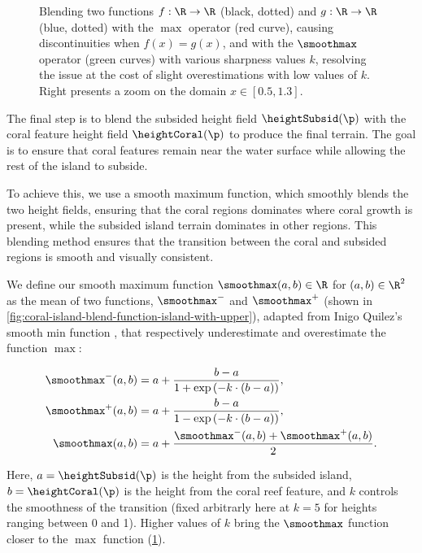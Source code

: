 \begin{figure}
    \caption[Effect of $k$ on the $\smoothmax$ operator]{Blending two functions $f: \R \to \R$ (black, dotted) and $g: \R \to \R$ (blue, dotted) with the $\max$ operator (red curve), causing discontinuities when $f(x)=g(x)$, and with the $\smoothmax$ operator (green curves) with various sharpness values $k$, resolving the issue at the cost of slight overestimations with low values of $k$. Right presents a zoom on the domain $x \in [0.5, 1.3]$. }
    \label{fig:coral-island-blend-function-island}
\end{figure}

The final step is to blend the subsided height field $\heightSubsid(\p)$ with the coral feature height field $\heightCoral(\p)$ to produce the final terrain. The goal is to ensure that coral features remain near the water surface while allowing the rest of the island to subside.

To achieve this, we use a smooth maximum function, which smoothly blends the two height fields, ensuring that the coral regions dominates where coral growth is present, while the subsided island terrain dominates in other regions. This blending method ensures that the transition between the coral and subsided regions is smooth and visually consistent.

We define our smooth maximum function $\smoothmax(a, b) \in \R$ for $(a, b) \in \R^2$ as the mean of two functions, $\smoothmax^-$ and $\smoothmax^+$ (shown in \cref{fig:coral-island-blend-function-island-with-upper}), adapted from Inigo Quilez's smooth min function \cite{Quilez2013}, that respectively underestimate and overestimate the function $\max$:

\begin{align*}
    \smoothmax^-(a, b) &= a + \frac{b - a}{1 + \exp\left(-k \cdot (b - a) \right)}, \\
    \smoothmax^+(a, b) &= a + \frac{b - a}{1 - \exp\left(-k \cdot (b - a) \right)}, \\
    \smoothmax(a, b) &= a + \frac{\smoothmax^-(a, b) + \smoothmax^+(a, b)}{2}.
\end{align*}

Here, $a = \heightSubsid(\p)$ is the height from the subsided island, $b = \heightCoral(\p)$ is the height from the coral reef feature, and $k$ controls the smoothness of the transition (fixed arbitrarly here at $k=5$ for heights ranging between 0 and 1). Higher values of $k$ bring the $\smoothmax$ function closer to the $\max$ function (\cref{fig:coral-island-blend-function-island}).

